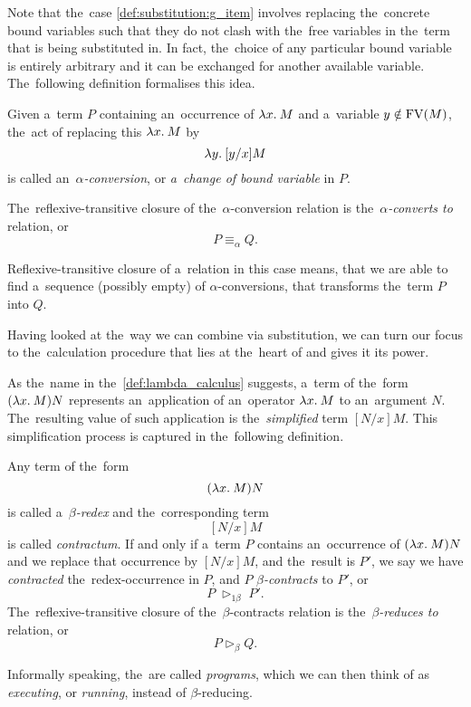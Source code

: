 Note that the~case \ref{def:substitution:g_item} involves replacing the~concrete
bound variables such that they do not clash with the~free variables in the~term
that is being substituted in. In fact, the~choice of any particular bound
variable is entirely arbitrary and it can be exchanged for another available
variable. The~following definition formalises this idea.

\begin{definition}
  Given a~term $P$ containing an~occurrence of $\lambda x . \: M$ and a~variable $y
  \notin \mathrm{FV}(M)$, the~act of replacing this $\lambda x . \: M$ by
  \[
    \lambda y . \: [y/x]M
  \]
  is called an~\emph{$\alpha$-conversion}, or \emph{a~change of bound variable}
  in $P$.

  The~reflexive-transitive closure of the~$\alpha$-conversion relation is
  the~\emph{$\alpha$-converts to} relation, or
  \[
    P \equiv_\alpha Q.
  \]
\end{definition}

Reflexive-transitive closure of a~relation in this case means, that we are able
to find a~sequence (possibly empty) of $\alpha$-conversions, that transforms
the~term $P$ into $Q$.

Having looked at the~way we can combine \lts via substitution, we can turn our
focus to the~calculation procedure that lies at the~heart of \lc and gives it
its power.


As the~name in the~\autoref{def:lambda_calculus} suggests, a~term of
the~form $(\lambda x . \: M) N$ represents an~application of an~operator $\lambda x . \: M$ to
an~argument $N$. The~resulting value of such application is the~\emph{simplified}
term $[N/x]M$. This simplification process is captured in the~following
definition.

\begin{definition}
  Any term of the~form
  \[
    (\lambda x . \: M) N
  \]
  is called a~\emph{$\beta$-redex} and the~corresponding term
  \[
    [N/x]M
  \]
  is called \emph{contractum}. If and only if a~term $P$ contains an~occurrence
  of $(\lambda x . \: M) N$ and we replace that occurrence by $[N/x]M$, and the~result
  is $P'$, we say we have \emph{contracted} the~redex-occurrence in $P$, and $P$
  \emph{$\beta$-contracts} to $P'$, or
  \[
    P \; \triangleright_{1\beta} \; P'.
  \]
  The~reflexive-transitive closure of the~$\beta$-contracts relation is
  the~\emph{$\beta$-reduces to} relation, or
  \[
    P \triangleright_\beta Q.
  \]
\end{definition}

Informally speaking, the~\lts are called \emph{programs}, which we can then
think of as \emph{executing}, or \emph{running}, instead of $\beta$-reducing.

